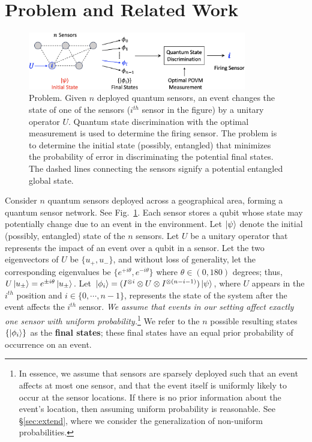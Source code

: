 \section{\iso Problem and Related Work}
\label{sec:tqc_problem}

\begin{figure}[ht]
    \centering
    \includegraphics[width=0.85\textwidth]{chapters/tqc/figures/ISO.png}
    \caption{\iso Problem. Given $n$ deployed quantum sensors, an event changes the state of one of the sensors  ($i^{th}$ sensor in the figure) by a unitary operator $U$. Quantum state discrimination with the optimal measurement is used to determine the firing sensor. The \iso problem is to determine the initial state (possibly, entangled) that minimizes the probability of error in discriminating the potential final states. The dashed lines connecting the sensors signify a potential entangled global state.
    } 
    \label{fig:qsn}
\end{figure}

 Consider $n$ quantum sensors deployed across a geographical area, forming a quantum sensor network. See Fig.~\ref{fig:qsn}. 
Each sensor stores a qubit whose state may potentially change due to an event in the environment.
Let $\ket{\psi}$ denote the initial (possibly, entangled) state of the $n$ sensors.
Let $U$ be a unitary operator that represents the impact of an event over a qubit in a sensor.
Let the two eigenvectors 
of $U$ be $\{u_+, u_-\}$, and without loss of generality,
let the corresponding eigenvalues be $\{e^{+i\theta}, e^{-i\theta}\}$
where $\theta \in (0, 180)$ degrees;
thus, $U\ket{u_{\pm}}=e^{\pm i\theta}\ket{u_{\pm}}$.
Let $\ket{\phi_i} = (I^{\otimes i} \otimes U \otimes I^{\otimes (n-i-1)})\ket{\psi}$, 
where $U$ appears in the $i^{th}$ 
position and $i\in \{0, \cdots, n-1 \}$, 
represents the state of the system after the event affects the $i^{th}$ sensor. 
{\em We assume that events in our setting affect exactly one sensor with uniform probability.}\footnote{In essence, we assume that sensors are sparsely deployed such that
an event affects at most one sensor, and that the event itself is uniformly likely to occur at the
sensor locations. 
If there is no prior information about the event's location, then assuming uniform probability is reasonable.
See \S\ref{sec:extend}, where we consider the generalization of non-uniform probabilities.}  
We refer to the $n$ possible resulting states $\{\ket{\phi_i}\}$ as the {\bf final states}; these
final states have an equal prior probability of occurrence on an event.

